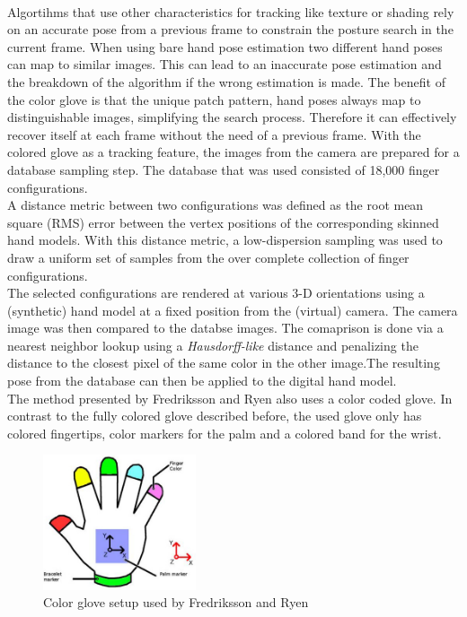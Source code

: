 \\Algortihms that use other characteristics for tracking like texture or shading \cite{LaGorce.2008} rely on an accurate pose from a previous frame to constrain the posture search in the current frame. When using bare hand pose estimation two different hand poses can map to similar images. This can lead to an inaccurate pose estimation and the breakdown of the algorithm if the wrong estimation is made.
The benefit of the color glove is that the unique patch pattern, hand poses always map to distinguishable images, simplifying the search process. Therefore it can effectively recover itself at each frame without the need of a previous frame.
With the colored glove as a tracking feature, the images from the camera are prepared for a database sampling step. The database that was used consisted of 18,000 finger configurations. 
\\A distance metric between two configurations was defined as the root mean square (RMS) error between the vertex positions of the corresponding skinned hand models. With this distance metric, a low-dispersion sampling was used to draw a uniform set of samples from the over complete collection of finger configurations.
\\The selected configurations are rendered at various 3-D orientations using a (synthetic) hand model at a fixed position from the (virtual) camera.
The camera image was then compared to the databse images. The comaprison is done via a nearest neighbor lookup using a \textit{Hausdorff-like} distance \cite{Huttenlocher.1993} and penalizing the distance to the closest pixel of the same color in the other image.The resulting pose from the database can then be applied to the digital hand model.\\
The method presented by Fredriksson and Ryen \cite{Fredriksson.2008} also uses a color coded glove. In contrast to the fully colored glove described before, the used glove only has colored fingertips, color markers for the palm and a colored band for the wrist.
\begin{figure}
\includegraphics[width=0.4\textwidth]{images/fredrikkson_color_glove.JPG}
\caption{Color glove setup used by Fredriksson and Ryen \cite{Fredriksson.2008} }
\label{Fredriksson color glove}
\end{figure}
